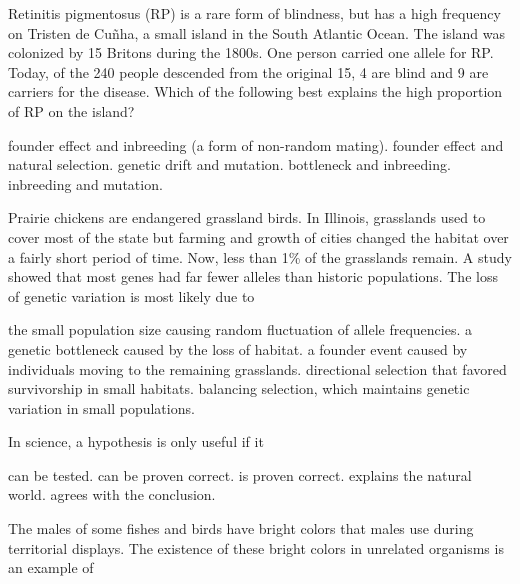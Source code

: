 \question
Retinitis pigmentosus (RP) is a rare form of blindness, but has a high frequency on Tristen de Cu\~nha, a small island in the South Atlantic Ocean.  The island was colonized by 15 Britons during the 1800s.  One person carried one allele for RP.  Today, of the 240 people descended from the original 15, 4 are blind and 9 are carriers for the disease.  Which of the following best explains the high proportion of RP on the island?

\begin{choices}
\correctchoice founder effect and inbreeding (a form of non-random mating).%
\choice founder effect and natural selection.%
\choice genetic drift and mutation.%
\choice bottleneck and inbreeding.%
\choice inbreeding and mutation.%
\end{choices}

\question
Prairie chickens are endangered grassland birds. In Illinois, 
grasslands used to cover most of the state but farming and growth of 
cities changed the habitat over a fairly short period of time. Now, 
less than 1\% of the grasslands remain. A study showed that most genes 
had far fewer alleles than historic populations. The loss of genetic 
variation is most likely due to

\begin{choices}
\choice the small population size causing random fluctuation of allele frequencies. %
\correctchoice a genetic bottleneck caused by the loss of habitat. %
\choice a founder event caused by individuals moving to the remaining grasslands. %
\choice directional selection that favored survivorship in small habitats. %
\choice balancing selection, which maintains genetic variation in small populations. %
\end{choices}

\question
In science, a hypothesis is only useful if it

\begin{choices}
	\correctchoice can be tested. %
	\choice can be proven correct. %
	\choice is proven correct. %
	\choice explains the natural world. %
	\choice agrees with the conclusion. %
\end{choices}

\question
The males of some fishes and birds have bright colors that males use during territorial displays. The existence of these bright colors in unrelated organisms is an example of 

